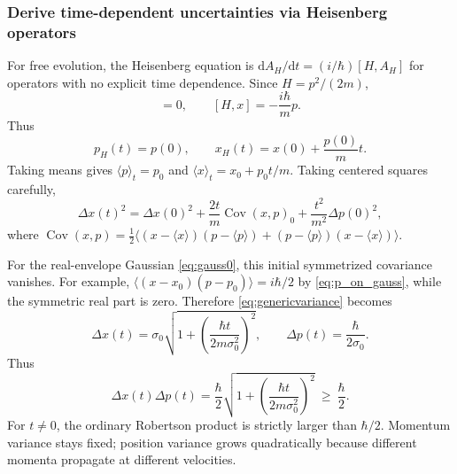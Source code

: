 \documentclass[11pt,a4paper]{article}
\newcommand{\dd}{\mathrm{d}}
\newcommand{\Cov}{\operatorname{Cov}}
\begin{document}
\subsubsection{Derive time-dependent uncertainties via Heisenberg operators}
For free evolution, the Heisenberg equation is $\dd A_H/\dd t=(i/\hbar)[H,A_H]$ for operators with no explicit time dependence. Since $H=p^2/(2m)$,
\begin{equation}
[H,p]=0,\qquad [H,x]=-\frac{i\hbar}{m}p.
\end{equation}
Thus
\begin{equation}\label{eq:hex}
\boxed{p_H(t)=p(0)},\qquad
\boxed{x_H(t)=x(0)+\frac{p(0)}m t}.
\end{equation}
Taking means gives $\langle p\rangle_t=p_0$ and $\langle x\rangle_t=x_0+p_0t/m$. Taking centered squares carefully,
\begin{equation}\label{eq:genericvariance}
\boxed{\Delta x(t)^2=\Delta x(0)^2+\frac{2t}{m}\Cov(x,p)_0+\frac{t^2}{m^2}\Delta p(0)^2},
\end{equation}
where $\Cov(x,p)=\frac12\langle (x-\langle x\rangle)(p-\langle p\rangle)+(p-\langle p\rangle)(x-\langle x\rangle)\rangle$.\par
For the real-envelope Gaussian \eqref{eq:gauss0}, this initial symmetrized covariance vanishes. For example, $\langle(x-x_0)(p-p_0)\rangle=i\hbar/2$ by \eqref{eq:p_on_gauss}, while the symmetric real part is zero. Therefore \eqref{eq:genericvariance} becomes
\begin{equation}\label{eq:gausstime}
\boxed{\Delta x(t)=\sigma_0\sqrt{1+\left(\frac{\hbar t}{2m\sigma_0^2}\right)^2}},\qquad
\boxed{\Delta p(t)=\frac\hbar{2\sigma_0}}.
\end{equation}
Thus
\begin{equation}\label{eq:prodtime}
\boxed{\Delta x(t)\Delta p(t)=\frac\hbar2\sqrt{1+\left(\frac{\hbar t}{2m\sigma_0^2}\right)^2}\ \ge\ \frac\hbar2}.
\end{equation}
For $t\ne0$, the ordinary Robertson product is strictly larger than $\hbar/2$. Momentum variance stays fixed; position variance grows quadratically because different momenta propagate at different velocities.
\end{document}
